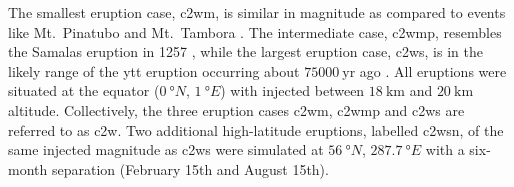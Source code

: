 \documentclass{ametsocV6.1}
\newcommand{\iso}[1][i]{{#1}njected \ce{SO2}}
\begin{document}
The smallest eruption case, \gls{c2wm}, is similar in magnitude as compared to events
like Mt.\ Pinatubo
\citep[\(\sim10\)--\(\SI{20}{\tera\gram(\ce{SO2})}\);][]{timmreck2018} and Mt.\ Tambora
\citep[\(\sim\SI{56.2}{\tera\gram(\ce{SO2})}\);][]{zanchettin2016}. The intermediate
case, \gls{c2wmp}, resembles the Samalas eruption in 1257
\citep[\(\sim{144}\)--\(\SI{170}{\tera\gram(\ce{SO2})}\);][]{vidal2016},
while the largest eruption case, \gls{c2ws}, is in the likely range of the \gls{ytt} eruption
occurring about \(\SI{75000}{\mathrm{yr}}\) ago
\citep[\(100\)--\(\SI{10000}{\tera\gram(\ce{SO2})}\);][]{jones2005}. All eruptions were
situated at the equator (\(\SI{0}{\degree N}\), \(\SI{1}{\degree E}\)) with 
injected between \(\SI{18}{\kilo\meter}\) and \(\SI{20}{\kilo\meter}\) altitude.
Collectively, the three eruption cases \gls{c2wm}, \gls{c2wmp} and \gls{c2ws} are
referred to as \gls{c2w}. Two additional high-latitude eruptions, labelled \gls{c2wsn},
of the same \iso{} magnitude as \gls{c2ws} were simulated at \(\SI{56}{\degree N}\),
\(\SI{287.7}{\degree E}\) with a six-month separation (February 15th and August 15th).
\end{document}
